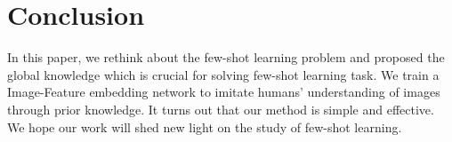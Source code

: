 \documentclass[runningheads]{llncs}
\begin{document}
\section{Conclusion}
In this paper, we rethink about the few-shot learning problem and proposed the global knowledge which is crucial for solving few-shot learning task. We train a Image-Feature embedding network to imitate humans' understanding of images through prior knowledge. It turns out that our method is simple and effective. We hope our work will shed new light on the study of few-shot learning.




\end{document}
